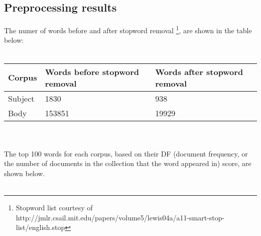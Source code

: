 \documentclass[12pt]{article}
\begin{document}
\subsection{Preprocessing results}
The numer of words before and after stopword removal
\footnote{Stopword list courtesy of
http://jmlr.csail.mit.edu/papers/volume5/lewis04a/a11-smart-stop-list/english.stop},
 are shown in the table below: \\\\
\begin{tabular}{ | l | l | l | }
\hline
Corpus & Words before stopword removal & Words after stopword removal\\ \hline
Subject & 1830 & 938  \\ \hline
Body & 153851 & 19929 \\ \hline
\end{tabular} \\\\
The top 100 words for each corpus, based on their DF (document frequency, or the number
of documents in the collection that the word appeared in) score, are shown below. \\\\
\end{document}
